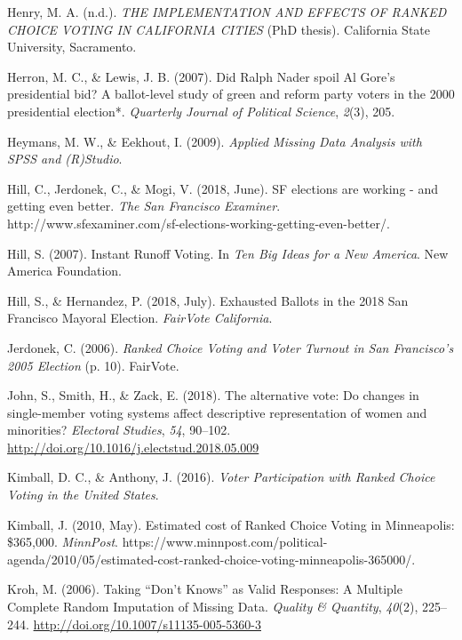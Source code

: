 \documentclass[12pt,twoside]{reedthesis}
\begin{document}
\leavevmode\hypertarget{ref-henry_implementation_2016}{}%
Henry, M. A. (n.d.). \emph{THE IMPLEMENTATION AND EFFECTS OF RANKED CHOICE VOTING IN CALIFORNIA CITIES} (PhD thesis). California State University, Sacramento.

\leavevmode\hypertarget{ref-herron_did_2007}{}%
Herron, M. C., \& Lewis, J. B. (2007). Did Ralph Nader spoil Al Gore's presidential bid? A ballot-level study of green and reform party voters in the 2000 presidential election*. \emph{Quarterly Journal of Political Science}, \emph{2}(3), 205.

\leavevmode\hypertarget{ref-heymans_applied_2009}{}%
Heymans, M. W., \& Eekhout, I. (2009). \emph{Applied Missing Data Analysis with SPSS and (R)Studio}.

\leavevmode\hypertarget{ref-hill_sf_2018}{}%
Hill, C., Jerdonek, C., \& Mogi, V. (2018, June). SF elections are working - and getting even better. \emph{The San Francisco Examiner}. http://www.sfexaminer.com/sf-elections-working-getting-even-better/.

\leavevmode\hypertarget{ref-hill_instant_2007}{}%
Hill, S. (2007). Instant Runoff Voting. In \emph{Ten Big Ideas for a New America}. New America Foundation.

\leavevmode\hypertarget{ref-hill_exhausted_2018}{}%
Hill, S., \& Hernandez, P. (2018, July). Exhausted Ballots in the 2018 San Francisco Mayoral Election. \emph{FairVote California}.

\leavevmode\hypertarget{ref-jerdonek_ranked_2006}{}%
Jerdonek, C. (2006). \emph{Ranked Choice Voting and Voter Turnout in San Francisco's 2005 Election} (p. 10). FairVote.

\leavevmode\hypertarget{ref-john_alternative_2018}{}%
John, S., Smith, H., \& Zack, E. (2018). The alternative vote: Do changes in single-member voting systems affect descriptive representation of women and minorities? \emph{Electoral Studies}, \emph{54}, 90--102. \url{http://doi.org/10.1016/j.electstud.2018.05.009}

\leavevmode\hypertarget{ref-kimball_voter_2016}{}%
Kimball, D. C., \& Anthony, J. (2016). \emph{Voter Participation with Ranked Choice Voting in the United States}.

\leavevmode\hypertarget{ref-kimball_estimated_2010}{}%
Kimball, J. (2010, May). Estimated cost of Ranked Choice Voting in Minneapolis: \$365,000. \emph{MinnPost}. https://www.minnpost.com/political-agenda/2010/05/estimated-cost-ranked-choice-voting-minneapolis-365000/.

\leavevmode\hypertarget{ref-kroh_taking_2006}{}%
Kroh, M. (2006). Taking ``Don't Knows'' as Valid Responses: A Multiple Complete Random Imputation of Missing Data. \emph{Quality \& Quantity}, \emph{40}(2), 225--244. \url{http://doi.org/10.1007/s11135-005-5360-3}
\end{document}
